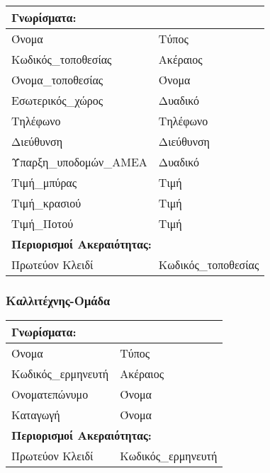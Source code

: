 \begin{tabular}{|p{6cm}|p{8cm}|}
  \multicolumn{2}{l}{\textbf{Γνωρίσματα:}}               \\ \hline
  Όνομα                  & Τύπος                         \\ \hline
  Κωδικός\_τοποθεσίας    & Ακέραιος                      \\ \hline
  Όνομα\_τοποθεσίας      & Όνομα                         \\ \hline
  Εσωτερικός\_χώρος      & Δυαδικό                       \\ \hline
  Τηλέφωνο               & Τηλέφωνο                      \\ \hline
  Διεύθυνση              & Διεύθυνση                     \\ \hline
  Ύπαρξη\_υποδομών\_ΑΜΕΑ & Δυαδικό                       \\ \hline
  Τιμή\_μπύρας           & Τιμή                          \\ \hline
  Τιμή\_κρασιού          & Τιμή                          \\ \hline
  Τιμή\_Ποτού            & Τιμή                          \\ \hline
  \multicolumn{2}{l}{\textbf{Περιορισμοί Ακεραιότητας:}} \\ \hline
  Πρωτεύον Κλειδί        & Κωδικός\_τοποθεσίας           \\ \hline
\end{tabular}


\subsubsection*{Καλλιτέχνης-Ομάδα}

\begin{tabular}{|p{6cm}|p{8cm}|}
  \multicolumn{2}{l}{\textbf{Γνωρίσματα:}}               \\ \hline
  Όνομα              & Τύπος                             \\ \hline
  Κωδικός\_ερμηνευτή & Ακέραιος                          \\ \hline
  Ονοματεπώνυμο      & Όνομα                             \\ \hline
  Καταγωγή           & Όνομα                             \\ \hline
  \multicolumn{2}{l}{\textbf{Περιορισμοί Ακεραιότητας:}} \\ \hline
  Πρωτεύον Κλειδί    & Κωδικός\_ερμηνευτή                \\ \hline
\end{tabular}

